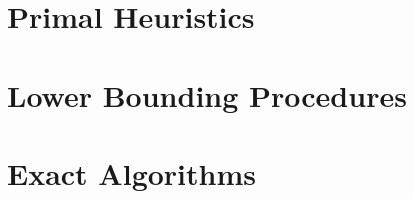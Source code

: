 

\clearpage
\section{Primal Heuristics}\label{sec:solving:primal}



\section{Lower Bounding Procedures}
\label{sec:solving:lower}

\section{Exact Algorithms}\label{sec:solving:exact}
